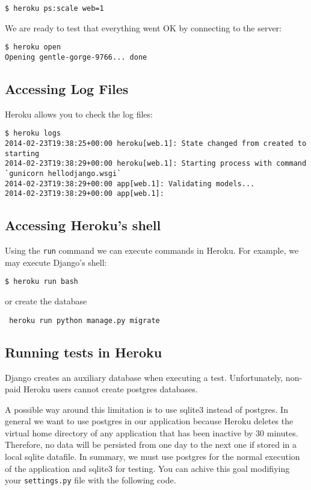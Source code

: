 \documentclass[12pt]{article} %
\begin{document}
 \begin{verbatim}
$ heroku ps:scale web=1
 \end{verbatim}

We are ready to test that everything went OK by connecting to the server:  

 \begin{verbatim}
$ heroku open
Opening gentle-gorge-9766... done
 \end{verbatim}


\subsection{Accessing Log Files}

 Heroku allows you to check the log files:
 
\begin{verbatim}
$ heroku logs
2014-02-23T19:38:25+00:00 heroku[web.1]: State changed from created to starting
2014-02-23T19:38:29+00:00 heroku[web.1]: Starting process with command `gunicorn hellodjango.wsgi`
2014-02-23T19:38:29+00:00 app[web.1]: Validating models...
2014-02-23T19:38:29+00:00 app[web.1]:
\end{verbatim}


\subsection{Accessing Heroku's shell}

Using the \texttt{run} command we can execute commands in Heroku. For example,  we may execute Django's shell:

\begin{verbatim}
$ heroku run bash
\end{verbatim}
or create the database

\begin{verbatim}
 heroku run python manage.py migrate
\end{verbatim}

\subsection{Running tests in Heroku}
Django creates an auxiliary database when executing a test. Unfortunately, non-paid Heroku users 
cannot create postgres databases.

A possible way around this limitation is to use sqlite3 instead of postgres. In general we want to use postgres in our application because Heroku deletes the virtual home directory of any application that has been inactive by 30 minutes. Therefore, no data will be persisted from one day to the next one if stored in a local sqlite datafile. In summary, we must use postgres for the normal execution of the application and sqlite3 for testing. You can achive this goal modifiying your \texttt{settings.py} file with the following code. 
\end{document}
